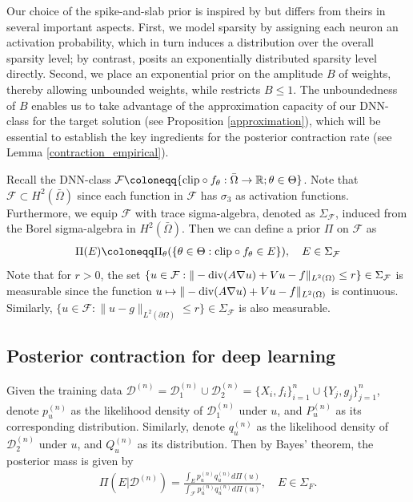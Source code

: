 \documentclass{article}
\newcommand{\R}{\mathbb{R}}
\newcommand{\F}{\mathcal{F}}
\newcommand{\D}{\mathcal{D}}
\newcommand{\clip}{\textnormal{clip}}
\renewcommand{\div}{\textnormal{div}}
\theoremstyle{plain}
\theoremstyle{definition}
\theoremstyle{remark}
\begin{document}
Our choice of the spike-and-slab prior  is inspired by \cite{polson2018posterior} but differs from theirs in several important aspects. First, we model sparsity by assigning each neuron an activation probability, which in turn induces a distribution over the overall sparsity level; by contrast, \cite{polson2018posterior} posits an exponentially distributed sparsity level directly. Second, we place an exponential prior on the amplitude  $B$ of weights, thereby allowing unbounded weights,  while \cite{polson2018posterior} restricts $B\leq 1$. The unboundedness of $B$ enables us to take advantage of the approximation capacity of our DNN-class for the target solution (see Proposition \ref{approximation}), which will be essential to establish the key ingredients for the posterior contraction rate (see Lemma \ref{contraction_empirical}). 


Recall the DNN-class $\F \coloneqq \{\clip \circ f_\theta: \bar{\Omega} \to \R;  \theta \in \Theta\}$. Note that $\F \subset H^2(\bar{\Omega})$ since each function in $\F$ has $\sigma_3$ as activation functions. Furthermore, we equip $\F$ with trace sigma-algebra, denoted as $\Sigma_\F$, induced from the Borel sigma-algebra in $H^2(\bar{\Omega})$. Then we can define a prior $\Pi$ on $\F$ as
\begin{align} \label{prior}
    \Pi(E) \coloneqq \Pi_\theta(\{\theta \in \Theta: \clip \circ f_\theta \in E \}), \quad E \in \Sigma_{\F}
\end{align}
Note that for $r > 0$, the set 
$\{u \in \F: \|-\div(A \nabla u) + V u - f\|_{L^2(\Omega)} \leq r\} \in \Sigma_\F$ is measurable since the function $u \mapsto \|-\div(A \nabla u) + V u - f\|_{L^2(\Omega)}$ is continuous. Similarly, $\{u \in \F: \|u-g\|_{L^2(\partial \Omega)} \leq r\} \in \Sigma_{\F}$ is also measurable. 

\subsection{Posterior contraction for deep learning}
Given the training data $\D^{(n)} = \D_1^{(n)} \cup \D_2^{(n)} = \{X_i, f_i\}_{i=1}^n \cup \{Y_j, g_j\}_{j=1}^n$, denote $p_u^{(n)}$ as the likelihood density of $\D^{(n)}_1$ under $u$, and $P_u^{(n)}$ as its corresponding distribution. Similarly, denote $q_u^{(n)}$ as the likelihood density of $\D^{(n)}_2$ under $u$, and $Q_u^{(n)}$ as its distribution. Then by Bayes' theorem, the posterior mass is given by
\begin{align*}
    \Pi \left(E | \D^{(n)}\right) = \frac{\int_E p_u^{(n)} q_u^{(n)} d\Pi(u)}{\int_{\F} p_u^{(n)} q_u^{(n)} d\Pi(u)}, \quad E \in \Sigma_F.
\end{align*} 
\end{document}
